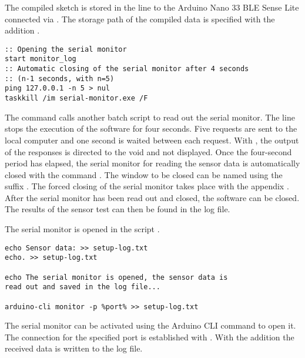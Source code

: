 The compiled sketch is stored in the line    to the Arduino Nano 33 BLE Sense Lite connected via . The storage path of the compiled data is specified with the addition .

\begin{lstlisting}
:: Opening the serial monitor
start monitor_log
:: Automatic closing of the serial monitor after 4 seconds 
:: (n-1 seconds, with n=5)
ping 127.0.0.1 -n 5 > nul
taskkill /im serial-monitor.exe /F
\end{lstlisting}

The command  calls another batch script to read out the serial monitor. The line  stops the execution of the software for four seconds. Five requests are sent to the local computer and one second is waited between each request. With , the output of the responses is directed to the void and not displayed. Once the four-second period has elapsed, the serial monitor for reading the sensor data is automatically closed with the command . The window to be closed can be named  using the suffix . The forced closing of the serial monitor takes place with the appendix . After the serial monitor has been read out and closed, the software can be closed. The results of the sensor test can then be found in the log file.

The serial monitor is opened in the script .

\begin{lstlisting}
echo Sensor data: >> setup-log.txt
echo. >> setup-log.txt
    
echo The serial monitor is opened, the sensor data is 
read out and saved in the log file...
    
arduino-cli monitor -p %port% >> setup-log.txt
\end{lstlisting}	

The serial monitor can be activated using the Arduino CLI command   to open it. The connection for the specified port is established with . With the addition  the received data is written to the log file.

